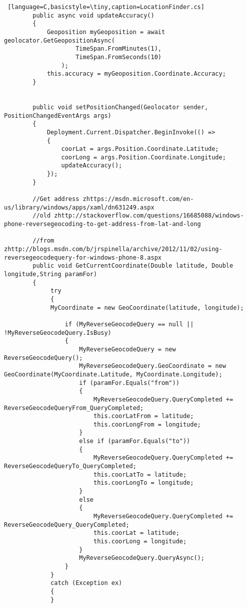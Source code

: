 \begin{lstlisting} [language=C,basicstyle=\tiny,caption=LocationFinder.cs]
        public async void updateAccuracy()
        {
            Geoposition myGeoposition = await geolocator.GetGeopositionAsync(
                    TimeSpan.FromMinutes(1),
                    TimeSpan.FromSeconds(10)
                );
            this.accuracy = myGeoposition.Coordinate.Accuracy;
        }


        public void setPositionChanged(Geolocator sender, PositionChangedEventArgs args)
        {
            Deployment.Current.Dispatcher.BeginInvoke(() =>
            {
                coorLat = args.Position.Coordinate.Latitude;
                coorLong = args.Position.Coordinate.Longitude;
                updateAccuracy();
            });
        }

        //Get address zhttps://msdn.microsoft.com/en-us/library/windows/apps/xaml/dn631249.aspx
        //old zhttp://stackoverflow.com/questions/16685088/windows-phone-reversegeocoding-to-get-address-from-lat-and-long

        //from zhttp://blogs.msdn.com/b/jrspinella/archive/2012/11/02/using-reversegeocodequery-for-windows-phone-8.aspx
        public void GetCurrentCoordinate(Double latitude, Double longitude,String paramFor)
        {
             try
             {
             MyCoordinate = new GeoCoordinate(latitude, longitude);
 
                 if (MyReverseGeocodeQuery == null || !MyReverseGeocodeQuery.IsBusy)
                 {
                     MyReverseGeocodeQuery = new ReverseGeocodeQuery();
                     MyReverseGeocodeQuery.GeoCoordinate = new GeoCoordinate(MyCoordinate.Latitude, MyCoordinate.Longitude);
                     if (paramFor.Equals("from"))
                     {
                         MyReverseGeocodeQuery.QueryCompleted += ReverseGeocodeQueryFrom_QueryCompleted;
                         this.coorLatFrom = latitude;
                         this.coorLongFrom = longitude;
                     }
                     else if (paramFor.Equals("to"))
                     {
                         MyReverseGeocodeQuery.QueryCompleted += ReverseGeocodeQueryTo_QueryCompleted;
                         this.coorLatTo = latitude;
                         this.coorLongTo = longitude;
                     }
                     else 
                     {
                         MyReverseGeocodeQuery.QueryCompleted += ReverseGeocodeQuery_QueryCompleted;
                         this.coorLat = latitude;
                         this.coorLong = longitude;
                     }
                     MyReverseGeocodeQuery.QueryAsync();
                 }
             }
             catch (Exception ex)
             {
             }
           

\end{lstlisting}
